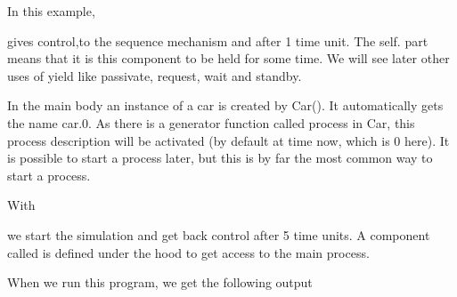 \documentclass[letterpaper,10pt,english]{sphinxmanual}
\begin{document}
In this example,

\begin{sphinxVerbatim}[commandchars=\\\{\}]
 
\end{sphinxVerbatim}

gives control,to the sequence mechanism and  after 1 time unit. The self. part means that
it is this component to be held for some time. We will see later other uses of yield like passivate,
request, wait and standby.

In the main body an instance of a car is created by Car(). It automatically gets the name car.0.
As there is a generator function called
process in Car, this process description will be activated (by default at time now, which is 0 here).
It is possible to start a process later, but this is by far the most common way to start a process.

With

\begin{sphinxVerbatim}[commandchars=\\\{\}]
\end{sphinxVerbatim}

we start the simulation and get back control after 5 time units. A component called  is defined
under the hood to get access to the main process.

When we run this program, we get the following output
\end{document}

